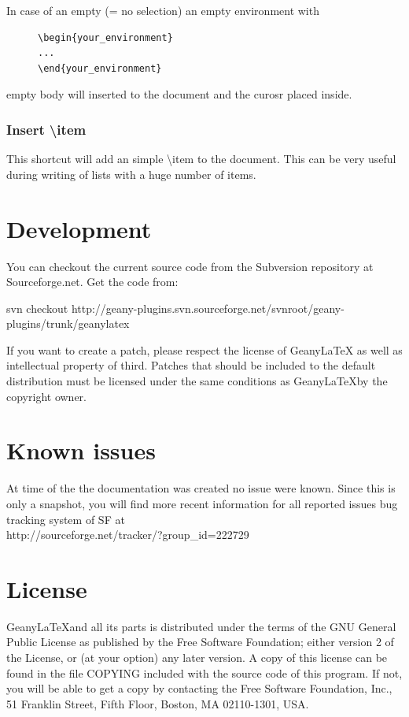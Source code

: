 \documentclass[/%
a4paper,%
10pt,%
oneside,%
DIV18,
headsepline,         %
plainheadsepline,
footsepline,         %
plainfootsepline,
bibtotoc,%
liststotoc,%
BCOR12mm,%
halfparskip,%
openany,%
]{scrartcl}
\begin{document}
In case of an empty (= no selection) an empty environment with
\begin{figure}[h!]
\begin{lstlisting}
\begin{your_environment}
...
\end{your_environment}
\end{lstlisting}
\end{figure}
empty body will inserted to the document and the curosr placed inside.

\subsubsection*{Insert \textbackslash item}
This shortcut will add an simple \textbackslash item to the document.
This can be very useful during writing of lists with a huge number of
items.


\section{Development}

You can checkout the current source code from the Subversion repository at
Sourceforge.net. Get the code from:

svn checkout
http://geany-plugins.svn.sourceforge.net/svnroot/geany-plugins/trunk/geanylatex

If you want to create a patch, please respect the license of Geany\LaTeX
as well as intellectual property of third. Patches that should be
included to the default distribution must be licensed under the same
conditions as Geany\LaTeX by the copyright owner.


\section{Known issues}

At time of the the documentation was created no issue were known.
Since this is only a snapshot, you will find more recent information
for all reported issues bug tracking system of SF at \\
http://sourceforge.net/tracker/?group\_id=222729


\section{License}


Geany\LaTeX and all its parts is distributed under the terms of the
GNU General Public License as published by the Free Software
Foundation; either version 2 of the License, or (at your option) any
later version. A copy of this license can be found in the file COPYING
included with the source code of this program. If not, you will be
able to get a copy by contacting the Free Software Foundation, Inc.,
51 Franklin Street, Fifth Floor, Boston, MA 02110-1301, USA.
\end{document}
